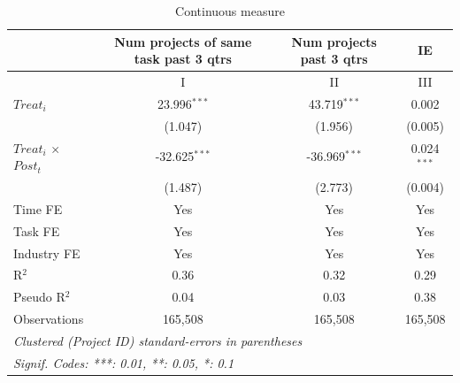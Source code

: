 \documentclass[
]{article}
\begin{document}
\begin{table}[htbp]
   \caption{Continuous measure}
   \centering
   \small
   \begin{tabular}{lccc}
      \toprule
                                   & Num projects of same task past 3 qtrs & Num projects past 3 qtrs & IE\\  
      \midrule & I & II & III\\
      \midrule 
      $Treat_i$                    & 23.996$^{***}$                        & 43.719$^{***}$           & 0.002\\   
                                   & (1.047)                               & (1.956)                  & (0.005)\\   
      $Treat_i$ $\times$ $Post_t$  & -32.625$^{***}$                       & -36.969$^{***}$          & 0.024$^{***}$\\   
                                   & (1.487)                               & (2.773)                  & (0.004)\\   
      \midrule 
      Time FE                      & Yes                                   & Yes                      & Yes\\  
      Task FE                      & Yes                                   & Yes                      & Yes\\  
      Industry FE                  & Yes                                   & Yes                      & Yes\\  
      R$^2$                        & 0.36                                  & 0.32                     & 0.29\\  
      Pseudo R$^2$                 & 0.04                                  & 0.03                     & 0.38\\  
      Observations                 & 165,508                               & 165,508                  & 165,508\\  
      \midrule
      \multicolumn{4}{l}{\emph{Clustered (Project ID) standard-errors in parentheses}}\\
      \multicolumn{4}{l}{\emph{Signif. Codes: ***: 0.01, **: 0.05, *: 0.1}}\\
   \end{tabular}
\end{table}
\begingroup
\centering
\small
\end{document}
